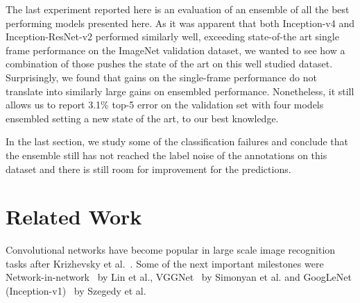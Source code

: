 \documentclass[10pt,twocolumn,letterpaper]{article}
\begin{document}
The last experiment reported here is an evaluation of an ensemble of
all the best performing models  presented here. As it was
apparent that both Inception-v4 and Inception-ResNet-v2 performed
similarly well, exceeding state-of-the art single frame performance
on the ImageNet validation dataset, we wanted to see how a combination
of those pushes the state of the art on this well studied dataset.
Surprisingly, we found that gains on the single-frame performance do not
translate into similarly large gains on ensembled performance. Nonetheless,
it still allows us to report 3.1\% top-5 error on the validation set with
four models ensembled setting a new state of the art, to our best
knowledge.

In the last section, we study some of the classification failures and
conclude that the ensemble still has not reached the label noise of
the annotations on this dataset and there is still room for improvement
for the predictions.
 \section{Related Work}

Convolutional networks have become popular in large scale image recognition
tasks after Krizhevsky et al.~\cite{krizhevsky2012imagenet}. Some of the next important
milestones were Network-in-network~\cite{lin2013network} by Lin et al.,
VGGNet~\cite{simonyan2014very} by Simonyan et al. and GoogLeNet
(Inception-v1)~\cite{szegedy2015going} by Szegedy et al.
\end{document}
